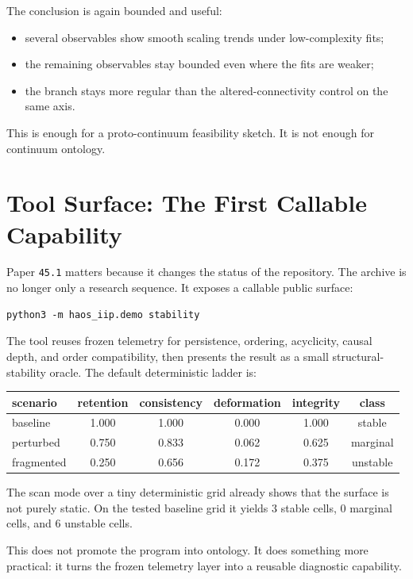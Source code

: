 \documentclass[11pt]{article}
\begin{document}
The conclusion is again bounded and useful:
\begin{itemize}
\item several observables show smooth scaling trends under low-complexity fits;
\item the remaining observables stay bounded even where the fits are weaker;
\item the branch stays more regular than the altered-connectivity control on the same axis.
\end{itemize}

This is enough for a proto-continuum feasibility sketch. It is not enough for continuum ontology.

\section{Tool Surface: The First Callable Capability}

Paper \texttt{45.1} matters because it changes the status of the repository. The archive is no longer only a research sequence. It exposes a callable public surface:
\begin{verbatim}
python3 -m haos_iip.demo stability
\end{verbatim}

The tool reuses frozen telemetry for persistence, ordering, acyclicity, causal depth, and order compatibility, then presents the result as a small structural-stability oracle. The default deterministic ladder is:
\begin{center}
\begin{tabular}{lccccc}
\toprule
scenario & retention & consistency & deformation & integrity & class \\
\midrule
baseline   & 1.000 & 1.000 & 0.000 & 1.000 & stable \\
perturbed  & 0.750 & 0.833 & 0.062 & 0.625 & marginal \\
fragmented & 0.250 & 0.656 & 0.172 & 0.375 & unstable \\
\bottomrule
\end{tabular}
\end{center}

The scan mode over a tiny deterministic grid already shows that the surface is not purely static. On the tested baseline grid it yields $3$ stable cells, $0$ marginal cells, and $6$ unstable cells.

This does not promote the program into ontology. It does something more practical: it turns the frozen telemetry layer into a reusable diagnostic capability.
\end{document}

